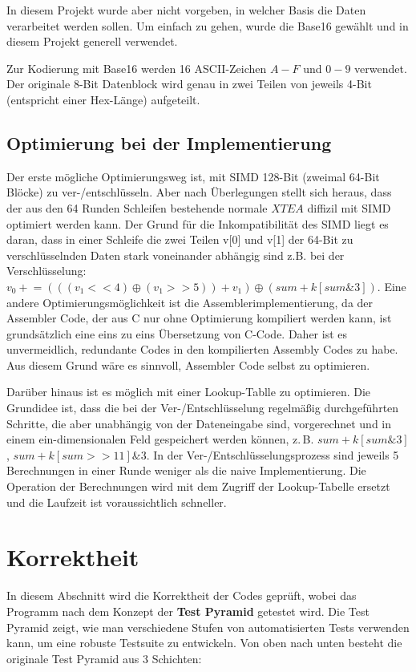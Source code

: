 \documentclass[course=erap]{aspdoc}
\begin{document}
In diesem Projekt wurde aber nicht vorgeben, in welcher Basis die Daten verarbeitet werden sollen. Um einfach zu gehen, wurde die Base16 gewählt und in diesem Projekt generell verwendet.

Zur Kodierung mit Base16 werden 16 ASCII-Zeichen $A-F$ und $0-9$ verwendet. Der originale 8-Bit Datenblock wird genau in zwei Teilen von jeweils 4-Bit (entspricht einer Hex-Länge) aufgeteilt.

\subsection{Optimierung bei der Implementierung}
Der erste mögliche Optimierungsweg ist, mit SIMD 128-Bit (zweimal 64-Bit Blöcke) zu ver-/entschlüsseln. Aber nach Überlegungen stellt sich heraus, dass der aus den 64 Runden Schleifen bestehende normale $XTEA$ diffizil mit SIMD optimiert werden kann. Der Grund für die Inkompatibilität des SIMD liegt es daran, dass in einer Schleife die zwei Teilen v[0] und v[1] der 64-Bit zu verschlüsselnden Daten stark voneinander abhängig sind z.B. bei der Verschlüsselung: $v_0 \mathrel{+}= (((v_1<<4)\oplus(v_1>>5))+v_1)\oplus (sum+k[sum\&3])$. Eine andere Optimierungsmöglichkeit ist die Assemblerimplementierung, da der Assembler Code, der aus C nur ohne Optimierung kompiliert werden kann, ist grundsätzlich eine eins zu eins Übersetzung von C-Code. Daher ist es unvermeidlich, redundante Codes in den kompilierten Assembly Codes zu habe. Aus diesem Grund wäre es sinnvoll, Assembler Code selbst zu optimieren.

Darüber hinaus ist es möglich mit einer Lookup-Tablle zu optimieren. Die Grundidee ist, dass die bei der Ver-/Entschlüsselung regelmäßig durchgeführten Schritte, die aber unabhängig von der Dateneingabe sind, vorgerechnet und in einem ein-dimensionalen Feld gespeichert werden können, z.\,B. $sum+k[sum\&3]$, $sum+k[sum>>11]\&3$. In der Ver-/Entschlüsselungsprozess sind jeweils 5 Berechnungen in einer Runde weniger als die naive Implementierung. Die Operation der Berechnungen wird mit dem Zugriff der Lookup-Tabelle ersetzt und die Laufzeit ist voraussichtlich schneller.

\section{Korrektheit}
In diesem Abschnitt wird die Korrektheit der Codes geprüft, wobei das Programm nach dem Konzept der \textbf{Test Pyramid} \cite{fowler_2018} getestet wird. Die Test Pyramid zeigt, wie man verschiedene Stufen von automatisierten Tests verwenden kann, um eine robuste Testsuite zu entwickeln. Von oben nach unten besteht die originale Test Pyramid aus 3 Schichten:
\end{document}

